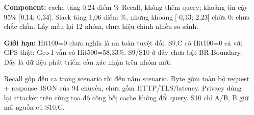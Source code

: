 \textbf{Component:} cache tăng 0,24 điểm \% Recall, không thêm query; khoảng tin cậy 95\% [0,14; 0,34]. Slack tăng 1,06 điểm \%, nhưng khoảng [-0,13; 2,23] chứa 0: chưa chắc chắn. Lấy mẫu lại 12 nhóm, chưa hiệu chỉnh nhiều so sánh.

\textbf{Giới hạn:} Hit100=0 chưa nghĩa là an toàn tuyệt đối. S9.C có Hit100=0 cả với GPS thật; Geo-I vẫn có Hit500=58,33\%. S9/S10 ở đây chưa bật BR-Boundary. Đây là dữ liệu phát triển; cần xác nhận trên nhóm mới.

Recall gộp đều ca trong scenario rồi đều năm scenario. Byte gồm toàn bộ request + response JSON của 94 chuyến, chưa gồm HTTP/TLS/latency. Privacy dùng lại attacker trên cùng tọa độ công bố; cache không đổi query. S10 chỉ A/B, B giữ mã nguồn cũ S10.C.


